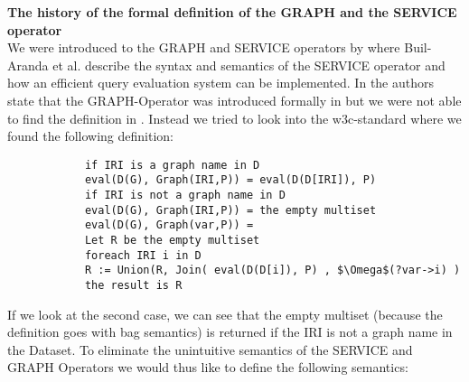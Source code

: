 			\noindent\textbf{The history of the formal definition of the GRAPH and the SERVICE
			operator}\\
			We were introduced to the GRAPH and
			SERVICE operators by \cite{BuilAranda20131} where Buil-Aranda et al.
			describe the syntax and semantics of the SERVICE operator and how an efficient query
			evaluation system can be implemented. In \cite{BuilAranda20131} the authors
			state that the GRAPH-Operator was introduced formally
			in \cite{perez2009semantics} but we were not able to find the definition in \cite{perez2009semantics}.
			Instead we tried to look into the w3c-standard\cite{w3standard} 
			where we found the following definition:

			\begin{lstlisting}
			if IRI is a graph name in D
			eval(D(G), Graph(IRI,P)) = eval(D(D[IRI]), P)
			if IRI is not a graph name in D
			eval(D(G), Graph(IRI,P)) = the empty multiset
			eval(D(G), Graph(var,P)) =
			Let R be the empty multiset
			foreach IRI i in D
			R := Union(R, Join( eval(D(D[i]), P) , $\Omega$(?var->i) )
			the result is R
			\end{lstlisting}

			If we look at the second case, we can see that the empty multiset (because the
			definition goes with bag semantics)
			is returned if the IRI is not a graph name in the Dataset. 
			To eliminate the unintuitive semantics of the SERVICE and GRAPH Operators we
			would thus like to define the following semantics:\\

